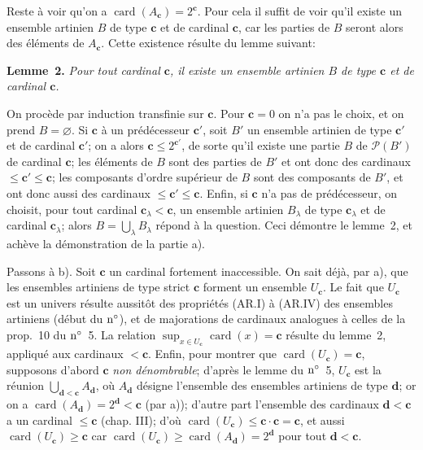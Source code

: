 \documentclass[12pt]{article}
\newcommand{\nn}{\noindent}
\newcommand{\card}{\operatorname{card}}
\begin{document}
Reste à voir qu'on a $\card(A_{\mathbf c})=2^{\mathbf c}$. Pour cela il suffit de voir qu'il existe un ensemble artinien $B$ de type $\mathbf c$ et de cardinal $\mathbf c$, car les parties de $B$ seront alors des éléments de $A_{\mathbf c}$. Cette existence résulte du lemme suivant:

\nn\textbf{Lemme~2.} \emph{Pour tout cardinal $\mathbf c$, il existe un ensemble artinien $B$ de type $\mathbf c$ et de cardinal $\mathbf c$.}

On procède par induction transfinie sur $\mathbf c$. Pour $\mathbf c=0$ on n'a pas le choix, et on prend $B=\varnothing$. Si $\mathbf c$ à un prédécesseur $\mathbf c'$, soit $B'$ un ensemble artinien de type $\mathbf c'$ et de cardinal $\mathbf c'$; on a alors $\mathbf c\leq 2^{\mathbf c'}$, de sorte qu'il existe une partie $B$ de $\mathcal{P}(B')$ de cardinal $\mathbf c$; les éléments de $B$ sont des parties de $B'$ et ont donc des cardinaux $\leq\mathbf c'\leq\mathbf c$; les composants d'ordre supérieur de $B$ sont des composants de $B'$, et ont donc aussi des cardinaux $\leq\mathbf c'\leq\mathbf c$. Enfin, si $\mathbf c$ n'a pas de prédécesseur, on choisit, pour tout cardinal $\mathbf c_{\lambda} < \mathbf c$, un ensemble artinien $B_{\lambda}$ de type $\mathbf c_{\lambda}$ et de cardinal $\mathbf c_{\lambda}$; alors $B=\bigcup _{\lambda}B_{\lambda}$ répond à la question. Ceci démontre le lemme~2, et achève la démonstration de la partie a).

Passons à b). Soit $\mathbf c$ un cardinal fortement inaccessible. On sait déjà, par a), que les ensembles artiniens de type strict $\mathbf c$ forment un ensemble $U_{\mathbf c}$. Le fait que $U_{\mathbf c}$ est un univers résulte aussitôt des propriétés (AR.I) à (AR.IV) des ensembles artiniens (début du $\rm n^\circ$), et de majorations de cardinaux analogues à celles de la prop.~10 du $\rm n^\circ$~5. La relation $\sup_{x\in U_{\mathbf c}} \card(x) = \mathbf c$ résulte du lemme~2,  appliqué aux cardinaux $ < \mathbf c$. Enfin, pour montrer que $\card(U_{\mathbf c}) = \mathbf c$, supposons d'abord $\mathbf c$ 
\emph{non dénombrable}; d'après le lemme du $\rm n^\circ$~5, $U_{\mathbf c}$ est la réunion $\bigcup_{\mathbf d < \mathbf c} A_{\mathbf d}$, où $A_{\mathbf d}$ désigne l'ensemble des ensembles artiniens de type $\mathbf d$; or on a $\card(A_{\mathbf d})= 2^{\mathbf d} < \mathbf c$ (par a)); d'autre part l'ensemble des cardinaux $\mathbf d < \mathbf c$ a un cardinal $\leq \mathbf c$ (chap. III); d'où $\card(U_{\mathbf c})\leq \mathbf c \cdot \mathbf c=\mathbf c$, et aussi $\card(U_{\mathbf c})\geq \mathbf c$ car $\card(U_{\mathbf c})\geq \card(A_{\mathbf d})=2^{\mathbf d}$ pour tout $\mathbf d < \mathbf c$.
\end{document}
